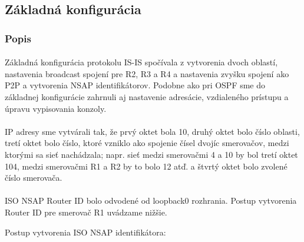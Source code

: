 \documentclass[12pt,twoside,a4paper]{report}
\begin{document}
\subsection{Základná konfigurácia}
\subsubsection{Popis}
\paragraph{}
Základná konfigurácia protokolu IS-IS spočívala z vytvorenia dvoch oblastí, nastavenia broadcast spojení pre R2, R3 a R4 a nastavenia zvyšku spojení ako P2P a vytvorenia NSAP identifikátorov. Podobne ako pri OSPF sme do základnej konfigurácie zahrnuli aj nastavenie adresácie, vzdialeného prístupu a úpravu vypisovania konzoly.

\paragraph{}
IP adresy sme vytvárali tak, že prvý oktet bola 10, druhý oktet bolo číslo oblasti, tretí oktet bolo číslo, ktoré vzniklo ako spojenie čísel dvojíc smerovačov, medzi ktorými sa sieť nachádzala; napr. sieť medzi smerovačmi 4 a 10 by bol tretí oktet 104, medzi smerovačmi R1 a R2 by to bolo 12 atď. a štvrtý oktet bolo zvolené číslo smerovača.

\paragraph{}
ISO NSAP Router ID bolo odvodené od loopback0 rozhrania. Postup vytvorenia Router ID pre smerovač R1 uvádzame nižšie.

Postup vytvorenia ISO NSAP identifikátora:
\end{document}
